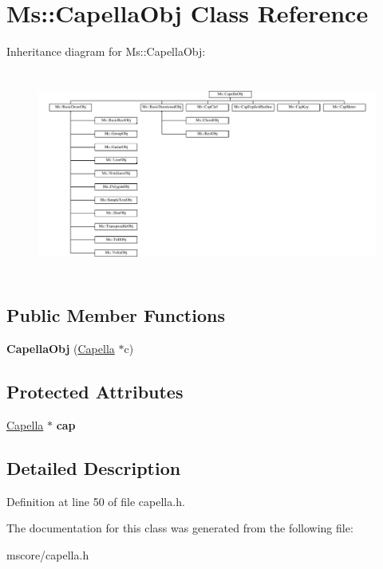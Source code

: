 \hypertarget{class_ms_1_1_capella_obj}{}\section{Ms\+:\+:Capella\+Obj Class Reference}
\label{class_ms_1_1_capella_obj}
Inheritance diagram for Ms\+:\+:Capella\+Obj\+:\begin{figure}[H]
\begin{center}
\leavevmode
\includegraphics[height=6.842105cm]{class_ms_1_1_capella_obj}
\end{center}
\end{figure}
\subsection*{Public Member Functions}
\begin{DoxyCompactItemize}
\item 
\mbox{\label{class_ms_1_1_capella_obj_a02373230a3b12b774b199f73a6841936}} 
{\bfseries Capella\+Obj} (\hyperlink{class_ms_1_1_capella}{Capella} $\ast$c)
\end{DoxyCompactItemize}
\subsection*{Protected Attributes}
\begin{DoxyCompactItemize}
\item 
\mbox{\label{class_ms_1_1_capella_obj_aa7b61cb914bf364fd6b05e1918e44062}} 
\hyperlink{class_ms_1_1_capella}{Capella} $\ast$ {\bfseries cap}
\end{DoxyCompactItemize}


\subsection{Detailed Description}


Definition at line 50 of file capella.\+h.



The documentation for this class was generated from the following file\+:\begin{DoxyCompactItemize}
\item 
mscore/capella.\+h\end{DoxyCompactItemize}
